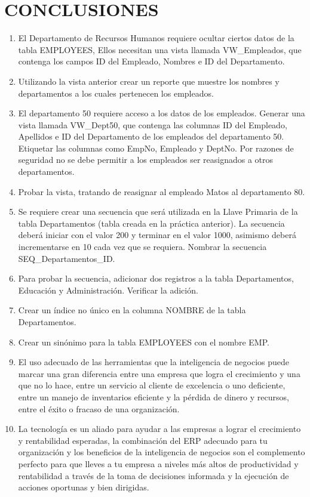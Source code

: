 \section{CONCLUSIONES} 
		
\begin{enumerate}[1.]
	\item El Departamento de Recursos Humanos requiere ocultar ciertos datos de la tabla EMPLOYEES, Ellos necesitan una vista llamada VW\_Empleados, que contenga los campos ID del Empleado, Nombres e ID del Departamento.
	\item Utilizando la vista anterior crear un reporte que muestre los nombres y departamentos a los cuales
pertenecen los empleados.
	\item El departamento 50 requiere acceso a los datos de los empleados. Generar una vista llamada VW\_Dept50, que contenga las columnas ID del Empleado, Apellidos e ID del Departamento de los empleados del departamento 50. Etiquetar las columnas como EmpNo, Empleado y DeptNo. Por razones de seguridad no se debe permitir a los empleados ser reasignados a otros departamentos.
	\item Probar la vista, tratando de reasignar al empleado Matos al departamento 80.
	\item Se requiere crear una secuencia que será utilizada en la Llave Primaria de la tabla Departamentos (tabla creada en la práctica anterior). La secuencia deberá iniciar con el valor 200 y terminar en el valor 1000, asimismo deberá incrementarse en 10 cada vez que se requiera. Nombrar la secuencia SEQ\_Departamentos\_ID.
	\item Para probar la secuencia, adicionar dos registros a la tabla Departamentos, Educación y Administración. Verificar la adición.
	\item Crear un índice no único en la columna NOMBRE de la tabla Departamentos.
	\item Crear un sinónimo para la tabla EMPLOYEES con el nombre EMP.

\item El uso adecuado de las herramientas que la inteligencia de negocios puede marcar una gran diferencia entre una empresa que logra el crecimiento y una que no lo hace, entre un servicio al cliente de excelencia o uno deficiente, entre un manejo de inventarios eficiente y la pérdida de dinero y recursos, entre el éxito o fracaso de una organización.

\item La tecnología es un aliado para ayudar a las empresas a lograr el crecimiento y rentabilidad esperadas, la combinación del ERP adecuado para tu organización y los beneficios de la inteligencia de negocios son el complemento perfecto para que lleves a tu empresa a niveles más altos de productividad y rentabilidad a través de la toma de decisiones informada y la ejecución de acciones oportunas y bien dirigidas.
\end{enumerate}

